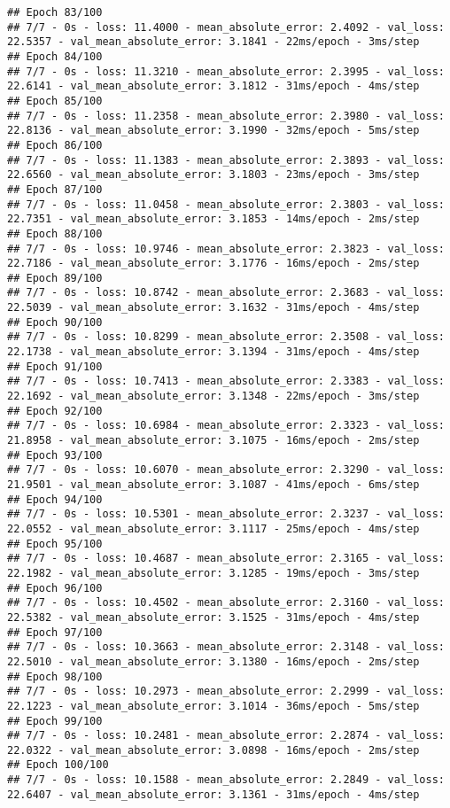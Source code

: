 \documentclass[
]{article}
\begin{document}
\begin{verbatim}
## Epoch 83/100
## 7/7 - 0s - loss: 11.4000 - mean_absolute_error: 2.4092 - val_loss: 22.5357 - val_mean_absolute_error: 3.1841 - 22ms/epoch - 3ms/step
## Epoch 84/100
## 7/7 - 0s - loss: 11.3210 - mean_absolute_error: 2.3995 - val_loss: 22.6141 - val_mean_absolute_error: 3.1812 - 31ms/epoch - 4ms/step
## Epoch 85/100
## 7/7 - 0s - loss: 11.2358 - mean_absolute_error: 2.3980 - val_loss: 22.8136 - val_mean_absolute_error: 3.1990 - 32ms/epoch - 5ms/step
## Epoch 86/100
## 7/7 - 0s - loss: 11.1383 - mean_absolute_error: 2.3893 - val_loss: 22.6560 - val_mean_absolute_error: 3.1803 - 23ms/epoch - 3ms/step
## Epoch 87/100
## 7/7 - 0s - loss: 11.0458 - mean_absolute_error: 2.3803 - val_loss: 22.7351 - val_mean_absolute_error: 3.1853 - 14ms/epoch - 2ms/step
## Epoch 88/100
## 7/7 - 0s - loss: 10.9746 - mean_absolute_error: 2.3823 - val_loss: 22.7186 - val_mean_absolute_error: 3.1776 - 16ms/epoch - 2ms/step
## Epoch 89/100
## 7/7 - 0s - loss: 10.8742 - mean_absolute_error: 2.3683 - val_loss: 22.5039 - val_mean_absolute_error: 3.1632 - 31ms/epoch - 4ms/step
## Epoch 90/100
## 7/7 - 0s - loss: 10.8299 - mean_absolute_error: 2.3508 - val_loss: 22.1738 - val_mean_absolute_error: 3.1394 - 31ms/epoch - 4ms/step
## Epoch 91/100
## 7/7 - 0s - loss: 10.7413 - mean_absolute_error: 2.3383 - val_loss: 22.1692 - val_mean_absolute_error: 3.1348 - 22ms/epoch - 3ms/step
## Epoch 92/100
## 7/7 - 0s - loss: 10.6984 - mean_absolute_error: 2.3323 - val_loss: 21.8958 - val_mean_absolute_error: 3.1075 - 16ms/epoch - 2ms/step
## Epoch 93/100
## 7/7 - 0s - loss: 10.6070 - mean_absolute_error: 2.3290 - val_loss: 21.9501 - val_mean_absolute_error: 3.1087 - 41ms/epoch - 6ms/step
## Epoch 94/100
## 7/7 - 0s - loss: 10.5301 - mean_absolute_error: 2.3237 - val_loss: 22.0552 - val_mean_absolute_error: 3.1117 - 25ms/epoch - 4ms/step
## Epoch 95/100
## 7/7 - 0s - loss: 10.4687 - mean_absolute_error: 2.3165 - val_loss: 22.1982 - val_mean_absolute_error: 3.1285 - 19ms/epoch - 3ms/step
## Epoch 96/100
## 7/7 - 0s - loss: 10.4502 - mean_absolute_error: 2.3160 - val_loss: 22.5382 - val_mean_absolute_error: 3.1525 - 31ms/epoch - 4ms/step
## Epoch 97/100
## 7/7 - 0s - loss: 10.3663 - mean_absolute_error: 2.3148 - val_loss: 22.5010 - val_mean_absolute_error: 3.1380 - 16ms/epoch - 2ms/step
## Epoch 98/100
## 7/7 - 0s - loss: 10.2973 - mean_absolute_error: 2.2999 - val_loss: 22.1223 - val_mean_absolute_error: 3.1014 - 36ms/epoch - 5ms/step
## Epoch 99/100
## 7/7 - 0s - loss: 10.2481 - mean_absolute_error: 2.2874 - val_loss: 22.0322 - val_mean_absolute_error: 3.0898 - 16ms/epoch - 2ms/step
## Epoch 100/100
## 7/7 - 0s - loss: 10.1588 - mean_absolute_error: 2.2849 - val_loss: 22.6407 - val_mean_absolute_error: 3.1361 - 31ms/epoch - 4ms/step
\end{verbatim}
\end{document}
